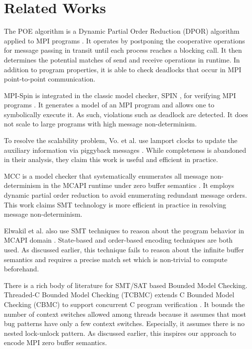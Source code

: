 \section{Related Works}
The POE algorithm is a Dynamic Partial Order Reduction (DPOR) algorithm \cite{DBLP:conf/popl/FlanaganG05} applied to MPI programs \cite{DBLP:conf/ppopp/VakkalankaSGK08}. It operates by postponing the cooperative operations for message passing in transit until each process reaches a blocking call. It then determines the potential matches of send and receive operations in runtime. In addition to program properties, it is able to check deadlocks that occur in MPI point-to-point communication.

MPI-Spin is integrated in the classic model checker, SPIN \cite{DBLP:journals/tse/Holzmann97}, for verifying MPI programs \cite{DBLP:conf/vmcai/Siegel07, DBLP:conf/pvm/Siegel07}. It generates a model of an MPI program and allows one to symbolically execute it. As such, violations such as deadlock are detected. It does not scale to large programs with high message non-determinism.

To resolve the scalability problem, Vo. et al. use lamport clocks to update the auxiliary information via piggyback messages \cite{DBLP:conf/sc/VoAGSSB10, DBLP:conf/IEEEpact/VoGKSSB11}. While completeness is abandoned in their analysis, they claim this work is useful and efficient in practice. 

MCC is a model checker that systematically enumerates all message non-determinism in the MCAPI runtime under zero buffer semantics \cite{DBLP:conf/fmcad/SharmaGMH09}. It employs dynamic partial order reduction to avoid enumerating redundant message orders. This work claims SMT technology is more efficient in practice in resolving message non-determinism. 

Elwakil et al. also use SMT techniques to reason about the program behavior in MCAPI domain \cite{DBLP:conf/issta/ElwakilY10, DBLP:conf/atva/ElwakilYW10}. State-based and order-based encoding techniques are both used. As discussed earlier, this technique fails to reason about the infinite buffer semantics and requires a precise match set which is non-trivial to compute beforehand.

There is a rich body of literature for SMT/SAT based Bounded Model Checking. 
Threaded-C Bounded Model Checking (TCBMC) extends C Bounded Model Checking (CBMC) \cite{DBLP:conf/tacas/ClarkeKL04, DBLP:conf/dac/ClarkeKY03} to support concurrent C program verification \cite{DBLP:conf/cav/RabinovitzG05}. It bounds the number of context switches allowed among threads because it assumes that most bug patterns have only a few context switches. Especially, it assumes there is no nested lock-unlock pattern. As discussed earlier, this inspires our approach to encode MPI zero buffer semantics.

